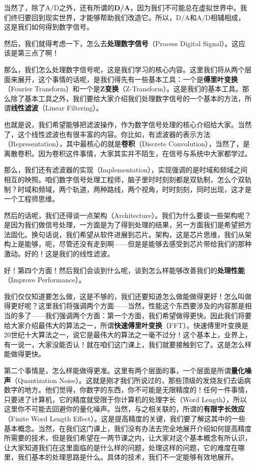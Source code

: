 \documentclass[a4paper,12pt]{article}
\begin{document}
当然了，除了A/D之外，还有所谓的\textbf{D/A}，因为我们不可能总在虚拟世界中。我们终归要回到现实世界，才能够帮助我们改造它。所以，D/A和A/D相辅相成，这是我们如何得到数字信号。


然后，我们就得考虑一下，怎么去\textbf{处理数字信号}（Process Digital Signal）。这应该是第三点了啊！

那么，我们怎么处理数字信号呢，这是我们学习的核心内容。这里我们将从两个层面来展开，这个事情的话呢，是我们得先有一些基本工具：一个是\textbf{傅里叶变换}（Fourier Transform）和一个是\textbf{Z变换}（Z-Transform）。这是我们的基本工具。那么除了基本工具之外，我们要给大家介绍我们处理数字信号的一个基本的方法，所谓\textbf{线性滤波}（Linear Filtering）。


也就是说，我们希望能够把滤波操作，作为数字信号处理的核心介绍给大家。当然了，这个线性滤波也有很丰富的内容。你比如，有滤波器的表示方法（Representation），其中最核心的就是\textbf{卷积}（Discrete Convolution），当然了，是离散卷积。因为卷积这件事情，大家其实并不陌生，在信号与系统中大家都学过。


那么，我们还有滤波器的实现（Implementation），实现强调的是时域和频域之间相互的映照。咱们数字信号处理工程师，脑子里时时刻刻都是双轨制，怎么个双轨制？时域和频域，两个轨道，两种路线，两个视角，时时刻刻，同时出现，这才是一个工程师思维。


然后的话呢，我们还得谈一点架构（Architecture）。我们为什么要谈一些架构呢？是因为我们做信号处理，一方面是为了得到处理的结果，另一方面我们是希望把方法固化。换句话说，我们希望从软件进展到芯片。架构，这是芯片思维，我们从架构上是能够，呃，尽管还没有走到啊——但是是能够去感受到芯片带给我们的那种激动。好的！这是我们的线性滤波。


好！第四个方面！然后我们会谈到什么呢，谈到怎么样能够改善我们的\textbf{处理性能}（Improve Performance）。


我们仅仅知道要怎么做，这是不够的，我们还要知道怎么做能做得更好！怎么叫做得更好呢？这里我们将强调两个方面——当然，性能这个东西要涉及的内容那是相当的多了——我们强调两个方面：第一个方面，我们希望做得更快。因此我们将要给大家介绍最伟大的算法之一，所谓\textbf{快速傅里叶变换}（FFT）。快速傅里叶变换是20世纪十大算法之一，说它是最伟大的算法之一毫不过分！这个基本上，业界上，有一说一，大家没能否认！就在咱们这门课上，我们就要接触到它了。这是怎么样能做得更快。


第二个事情是，怎么样能做得更准。这里有两个层面的事，一个层面是所谓\textbf{量化噪声}（Quantization Noise）。这就是刚才我们所说过的，那些顶级的发烧友们去诟病数字的地方。他们觉得，你数字的东西，你不可能是无限精度的！任何一件事情，只要进了计算机，它的精度就受限于你计算机的处理字长（Word Length），所以这里你不可能去回避你的量化噪声。当然，与之相关联的，所谓的\textbf{有限字长效应}（Finite Word Length Effect）。这是提高精度的关键，我们要了解这其中的一些基本概念。当然，在我们这门课上，我们没有办法去完全地展开介绍如何提高精度所需要的技术，但是我们希望在一两节课之内，让大家对这个基本概念有所认识，让大家知道我们在这里面临的是什么样的问题，处理这样的问题，它的难度在哪里，我们基本的处理思路是什么。具体的技术，我们不一定能够有效地展开。
\end{document}
